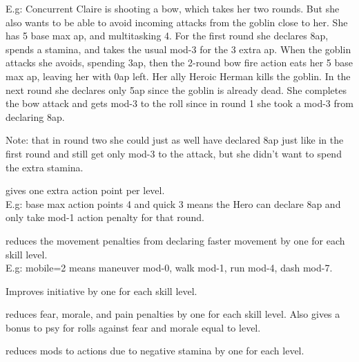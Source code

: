 E.g: Concurrent Claire is shooting a bow, which takes her two rounds. But she also wants to be able to avoid incoming attacks from the goblin close to her. She has 5 base max ap, and multitasking 4. For the first round she declares 8ap, spends a stamina, and takes the usual mod-3 for the 3 extra ap. When the goblin attacks she avoids, spending 3ap, then the 2-round bow fire action eats her 5 base max ap, leaving her with 0ap left. Her ally Heroic Herman kills the goblin. In the next round she declares only 5ap since the goblin is already dead. She completes the bow attack and gets mod-3 to the roll since in round 1 she took a mod-3 from declaring 8ap.

Note: that in round two she could just as well have declared 8ap just like in the first round and still get only mod-3 to the attack, but she didn't want to spend the extra stamina.


%
%
%
%


 gives one extra action point per level. \\
E.g: base max action points 4 and quick 3 means the Hero can declare 8ap and only take mod-1 action penalty for that round.


 reduces the movement penalties from declaring faster movement by one for each skill level. \\
E.g: mobile=2 means maneuver mod-0, walk mod-1, run mod-4, dash mod-7.


 Improves initiative by one for each skill level.


 reduces fear, morale, and pain penalties by one for each skill level. Also gives a bonus to psy for rolls against fear and morale equal to level.


 reduces mods to actions due to negative stamina by one for each level.


